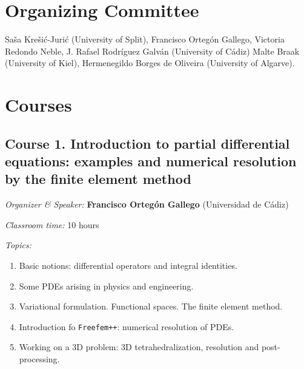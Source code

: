 \documentclass[letterpaper]{inzane_syllabus} %
\begin{document}
\vspace{0.5cm}
\section{Organizing Committee}

Saša Krešić-Jurić (University of Split), Francisco Ortegón Gallego, Victoria Redondo Neble, J. Rafael Rodríguez Galván (University of Cádiz) Malte Braak (University of Kiel), Hermenegildo Borges de Oliveira (University of Algarve). 

\newpage
\makeFullPage

\newcommand{\block}[3]{\par\textit{#1:} \textbf{#2} #3}

\section{Courses}

\subsection{Course 1. Introduction to partial differential equations: examples and numerical resolution by the finite element method}
\block{Organizer \& Speaker}{Francisco Ortegón Gallego}{(Universidad de Cádiz)}
\block{Classroom time}{}{10 hours}
\block{Topics}{}{}
\begin{enumerate}
  \item Basic notions: differential operators and integral identities. 
  \item Some PDEs arising in physics and engineering.
  \item Variational formulation. Functional spaces. The finite element method.
  \item Introduction fo \texttt{Freefem++}: numerical resolution of PDEs.
  \item Working on a 3D problem: 3D tetrahedralization, resolution and 
  post-processing.
\end{enumerate} 
\end{document}
